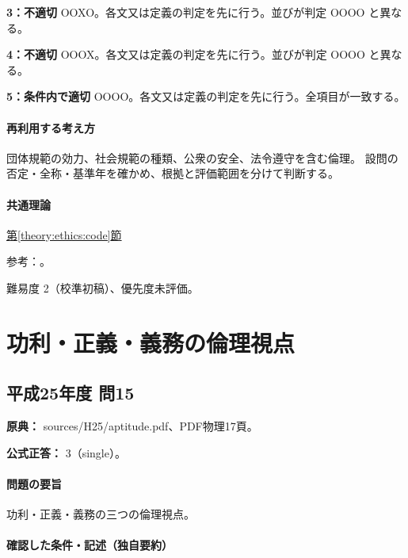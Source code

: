 \noindent\textbf{3：不適切} OOXO。各文又は定義の判定を先に行う。並びが判定 OOOO と異なる。\par

\noindent\textbf{4：不適切} OOOX。各文又は定義の判定を先に行う。並びが判定 OOOO と異なる。\par

\noindent\textbf{5：条件内で適切} OOOO。各文又は定義の判定を先に行う。全項目が一致する。\par

\paragraph{再利用する考え方} 団体規範の効力、社会規範の種類、公衆の安全、法令遵守を含む倫理。 設問の否定・全称・基準年を確かめ、根拠と評価範囲を分けて判断する。

\paragraph{共通理論} \hyperref[theory:ethics:code]{第\ref*{theory:ethics:code}節}

\par 参考：\cite{ipej_ethics2011}。

\par 難易度 2（校準初稿）、優先度未評価。

\section{功利・正義・義務の倫理視点}

\subsection{平成25年度 問15}
\label{q:h25-reg-apt-15}

\noindent\textbf{原典：} sources/H25/aptitude.pdf、PDF物理17頁。

\textbf{公式正答：} 3（single）。

\paragraph{問題の要旨} 功利・正義・義務の三つの倫理視点。

\paragraph{確認した条件・記述（独自要約）}\mbox{}\par

